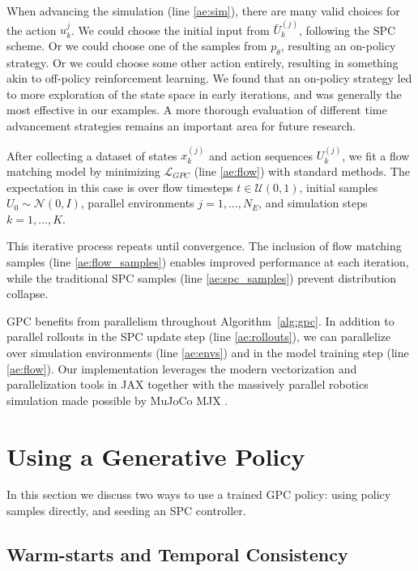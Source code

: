 \documentclass[letterpaper, 10 pt]{ieeeconf}
\begin{document}
When advancing the simulation (line \ref{ae:sim}), there are many valid choices for the action $u_k^{j}$. We could choose the initial input from $\bar{U}_k^{(j)}$, following the SPC scheme. Or we could choose one of the samples from $p_\theta$, resulting an on-policy strategy. Or we could choose some other action entirely, resulting in something akin to off-policy reinforcement learning. We found that an on-policy strategy led to more exploration of the state space in early iterations, and was generally the most effective in our examples. A more thorough evaluation of different time advancement strategies remains an important area for future research.

After collecting a dataset of states $x_k^{(j)}$ and action sequences $U_k^{(j)}$, we fit a flow matching model by minimizing $\mathcal{L}_{GPC}$ (line \ref{ae:flow}) with standard methods. The expectation in this case is over flow timesteps $t \in \mathcal{U}(0, 1)$, initial samples $U_0 \sim \mathcal{N}(0, I)$, parallel environments $j = 1,\dots, N_E$, and simulation steps $k = 1, \dots, K$.

This iterative process repeats until convergence. The inclusion of flow matching samples (line \ref{ae:flow_samples}) enables improved performance at each iteration, while the traditional SPC samples (line \ref{ae:spc_samples}) prevent distribution collapse. 

GPC benefits from parallelism throughout Algorithm~\ref{alg:gpc}. In addition to parallel rollouts in the SPC update step (line \ref{ae:rollouts}), we can parallelize over simulation environments (line \ref{ae:envs}) and in the model training step (line \ref{ae:flow}). Our implementation \cite{kurtz2025gpc} leverages the modern vectorization and parallelization tools in JAX \cite{jax2018github} together with the massively parallel robotics simulation made possible by MuJoCo MJX \cite{mjx}. 

\section{Using a Generative Policy}

In this section we discuss two ways to use a trained GPC policy: using policy samples directly, and seeding an SPC controller. 

\subsection{Warm-starts and Temporal Consistency}\label{sec:gpc_alone}
\end{document}
